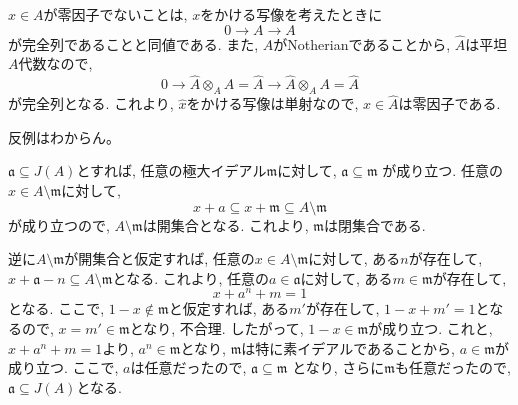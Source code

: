\documentclass[dvipdfmx]{jsarticle}
\begin{document}
    \begin{problem}
        $x \in A$が零因子でないことは, $x$をかける写像を考えたときに
        \[
            0 \longrightarrow A \longrightarrow A
        \]
        が完全列であることと同値である.
        また, $A$がNotherianであることから, $\widehat{A}$は平坦$A$代数なので,
        \[
            0 \longrightarrow \widehat{A} \otimes_A A = \widehat{A} \longrightarrow \widehat{A} \otimes_A A = \widehat{A}
        \]
        が完全列となる.
        これより, $\widehat{x}$をかける写像は単射なので,
        $\widehat{x} \in \widehat{A}$は零因子である.

        \color{red}
        反例はわからん。
        \color{black}
    \end{problem}

    \begin{problem}

    \end{problem}

    \begin{problem}
        $\mathfrak{a} \subseteq J(A)$とすれば, 任意の極大イデアル$\mathfrak{m}$に対して,
        $\mathfrak{a} \subseteq \mathfrak{m}$
        が成り立つ.
        任意の$x \in A \setminus \mathfrak{m}$に対して,
        \[
            x + a \subseteq x + \mathfrak{m} \subseteq A  \setminus \mathfrak{m}
        \]
        が成り立つので, $A \setminus \mathfrak{m}$は開集合となる.
        これより, $\mathfrak{m}$は閉集合である.

        逆に$A \setminus \mathfrak{m}$が開集合と仮定すれば, 任意の$x \in A \setminus \mathfrak{m}$に対して,
        ある$n$が存在して, $x + \mathfrak{a}-n \subseteq A \setminus \mathfrak{m}$となる.
        これより, 任意の$a \in \mathfrak{a}$に対して, ある$m \in \mathfrak{m}$が存在して,
        \[
            x + a^n + m = 1
        \]
        となる.
        ここで, $1-x \notin \mathfrak{m}$と仮定すれば, ある$m'$が存在して,
        $1-x + m' = 1$となるので, $x = m' \in \mathfrak{m}$となり,
        不合理.
        したがって, $1-x \in \mathfrak{m}$が成り立つ.
        これと, $x + a^n + m = 1$より, $a^n \in \mathfrak{m}$となり,
        $\mathfrak{m}$は特に素イデアルであることから, $a \in \mathfrak{m}$が成り立つ.
        ここで, $a$は任意だったので, $\mathfrak{a} \subseteq \mathfrak{m}$
        となり, さらに$\mathfrak{m}$も任意だったので, $\mathfrak{a }\subseteq J(A)$となる.
    \end{problem}
\end{document}
